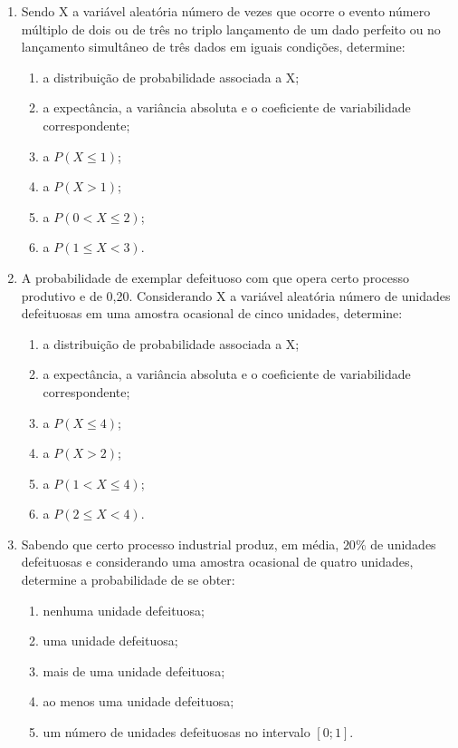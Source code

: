 \begin{enumerate}[resume]
\item Sendo X a variável aleatória número de vezes que ocorre o evento número múltiplo de dois ou de três no triplo lançamento de um dado perfeito ou no lançamento simultâneo de três dados em iguais condições, determine:
	\begin{enumerate}
	\item a distribuição de probabilidade associada a X;
	\item	a expectância, a variância absoluta e o coeficiente de variabilidade correspondente;
	\item a $P (X \leq 1)$;
	\item a $P(X > 1)$; 
	\item a $P(0 < X \leq 2)$;
	\item	a $P(1 \leq X < 3)$.	
	\end{enumerate}

\item A probabilidade de exemplar defeituoso com que opera certo processo produtivo e de 0,20. Considerando X a variável aleatória número de unidades defeituosas em uma amostra ocasional de cinco unidades, determine:
	\begin{enumerate}
	\item a distribuição de probabilidade associada a X;
	\item	a expectância, a variância absoluta e o coeficiente de variabilidade correspondente;
	\item a $P (X \leq 4)$;
	\item a $P(X > 2)$; 
	\item a $P(1 < X \leq 4)$;
	\item	a $P(2 \leq X < 4)$.	
	\end{enumerate}

\item Sabendo que certo processo industrial produz, em média, $20\%$ de unidades defeituosas e considerando uma amostra ocasional de quatro unidades, determine a probabilidade de se obter:
	\begin{enumerate}
	\item nenhuma unidade defeituosa;
	\item uma unidade defeituosa;
	\item mais de uma unidade defeituosa;
	\item ao menos uma unidade defeituosa;
	\item um número de unidades defeituosas no intervalo $[0;1]$.
	\end{enumerate}


\end{enumerate}
